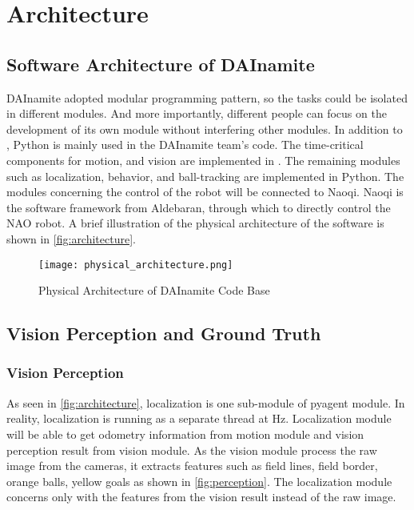 \chapter{Architecture\label{cha:chapter3}}



\section{Software Architecture of DAInamite}\label{sec:3.1}
DAInamite adopted modular programming pattern, so the tasks could be isolated in different modules. And more importantly, different people can focus on the development of its own module without interfering other modules. In addition to \cpp{}, Python is mainly used in the DAInamite team's code.
The time-critical components for motion, and vision are implemented in \cpp{}. The remaining modules such as localization, behavior, and ball-tracking are implemented in Python. The modules concerning the control of the robot will be connected to Naoqi. Naoqi is the software framework from Aldebaran, through which to directly control the NAO robot. A brief illustration of the physical architecture of the software is shown in \autoref{fig:architecture}. 

\begin{figure}[h!]
  \centering
  \texttt{[image: physical\_architecture.png]}
  \caption{Physical Architecture of DAInamite Code Base}
  \label{fig:architecture}
\end{figure}

\section{Vision Perception and Ground Truth}\label{sec:3.2}
\subsection{Vision Perception}\label{sub:vision}
As seen in \autoref{fig:architecture}, localization is one sub-module of pyagent module. In reality, localization is running as a separate thread at \unit[30]{Hz}. Localization module will be able to get odometry information from motion module and vision perception result from vision module. As the vision module process the raw image from the cameras, it extracts features such as field lines, field border, orange balls, yellow goals as shown in \autoref{fig:perception}. The localization module concerns only with the features from the vision result instead of the raw image.

